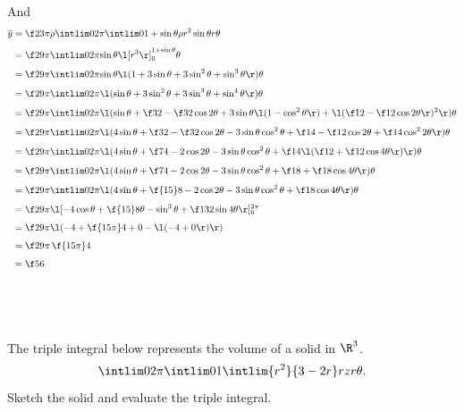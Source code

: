 \documentclass[a4paper]{article}
\begin{document}
And \begin{align*}
\overline y &= \f2{3\pi\rho} \intlim 0{2\pi} {\intlim 0 {1 + \sin \theta} {\rho r^2 \sin \theta} r} \theta \\[1ex]
&= \f2{9\pi} \intlim 0{2\pi} {\sin \theta \l[r^3\r]_0^{1 + \sin\theta}} \theta \\[1ex]
&= \f2{9\pi} \intlim 0{2\pi} {\sin \theta \l( 1 + 3\sin\theta + 3\sin^2 \theta + \sin^3 \theta \r)} \theta \\[1ex]
&= \f2{9\pi} \intlim 0{2\pi} {\l( \sin\theta + 3\sin^2 \theta + 3\sin^3 \theta + \sin^4 \theta \r)} \theta \\[1ex]
&= \f2{9\pi} \intlim 0{2\pi} {\l( \sin\theta + \f32 - \f32 \cos 2\theta + 3 \sin \theta \l(1 - \cos^2 \theta\r) + \l( \f12 - \f12 \cos 2\theta \r)^2 \r)} \theta \\[1ex]
&= \f2{9\pi} \intlim 0{2\pi} {\l( 4 \sin\theta + \f32 - \f32 \cos 2\theta - 3 \sin\theta \cos^2 \theta + \f14 - \f12 \cos 2\theta + \f14 \cos^2 2\theta \r)} \theta \\[1ex]
&= \f2{9\pi} \intlim 0{2\pi} {\l( 4 \sin\theta + \f74 - 2 \cos 2\theta - 3 \sin\theta \cos^2 \theta + \f14 \l( \f12 + \f12 \cos 4\theta \r) \r)} \theta \\[1ex]
&= \f2{9\pi} \intlim 0{2\pi} {\l( 4 \sin\theta + \f74 - 2 \cos 2\theta - 3 \sin\theta \cos^2 \theta + \f18 + \f18 \cos 4\theta \r)} \theta \\[1ex]
&= \f2{9\pi} \intlim 0{2\pi} {\l( 4 \sin\theta + \f{15}8 - 2 \cos 2\theta - 3 \sin\theta \cos^2 \theta + \f18 \cos 4\theta \r)} \theta \\[1ex]
&= \f2{9\pi} \l[ -4\cos\theta + \f{15}8 \theta - \sin^3 \theta + \f1{32}\sin 4\theta \r]_0^{2\pi} \\[1ex]
&= \f2{9\pi} \l( -4 + \f{15\pi}4 + 0 - \l( -4 + 0 \r) \r) \\[1ex]
&= \f2{9\pi} \, \f{15\pi}4 \\[1ex]
&= \f56
\end{align*}


\subsection{~} %

\begin{questionbody}
The triple integral below represents the volume of a solid in $\R^3$. \[
\intlim 0{2\pi} {\intlim 0 1 {\intlim {r^2} {3-2r} r z} r} \theta .
\] Sketch the solid and evaluate the triple integral.
\end{questionbody}
\end{document}
